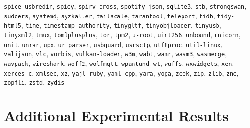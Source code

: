 {\texttt{spice-usbredir}, \texttt{spicy}, \texttt{spirv-cross}, \texttt{spotify-json}, \texttt{sqlite3}, \texttt{stb}, \texttt{strongswan}, \texttt{sudoers}, \texttt{systemd}, \texttt{syzkaller}, \texttt{tailscale}, \texttt{tarantool}, \texttt{teleport}, \texttt{tidb}, \texttt{tidy-html5}, \texttt{time}, \texttt{timestamp-authority}, \texttt{tinygltf}, \texttt{tinyobjloader}, \texttt{tinyusb}, \texttt{tinyxml2}, \texttt{tmux}, \texttt{tomlplusplus}, \texttt{tor}, \texttt{tpm2}, \texttt{u-root}, \texttt{uint256}, \texttt{unbound}, \texttt{unicorn}, \texttt{unit}, \texttt{unrar}, \texttt{upx}, \texttt{uriparser}, \texttt{usbguard}, \texttt{usrsctp}, \texttt{utf8proc}, \texttt{util-linux}, \texttt{valijson}, \texttt{vlc}, \texttt{vorbis}, \texttt{vulkan-loader}, \texttt{w3m}, \texttt{wabt}, \texttt{wamr}, \texttt{wasm3}, \texttt{wasmedge}, \texttt{wavpack}, \texttt{wireshark}, \texttt{woff2}, \texttt{wolfmqtt}, \texttt{wpantund}, \texttt{wt}, \texttt{wuffs}, \texttt{wxwidgets}, \texttt{xen}, \texttt{xerces-c}, \texttt{xmlsec}, \texttt{xz}, \texttt{yajl-ruby}, \texttt{yaml-cpp}, \texttt{yara}, \texttt{yoga}, \texttt{zeek}, \texttt{zip}, \texttt{zlib}, \texttt{znc}, \texttt{zopfli}, \texttt{zstd}, \texttt{zydis}
}


\section{Additional Experimental Results}
\label{app:results}


\paragraph{}


